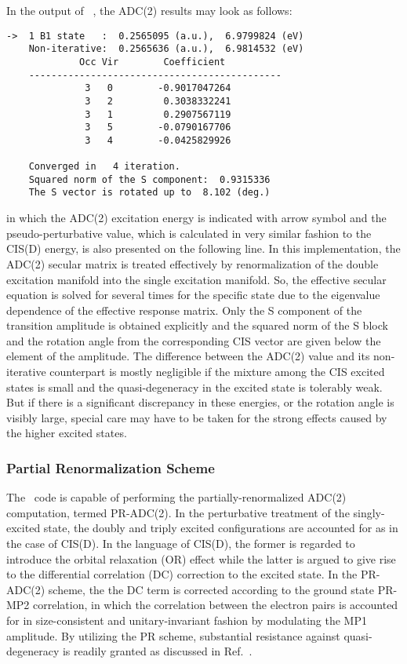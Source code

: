 In the output of \PSIadc\ , the ADC(2) results may look as follows:
\begin{verbatim}
->  1 B1 state   :  0.2565095 (a.u.),  6.9799824 (eV)
    Non-iterative:  0.2565636 (a.u.),  6.9814532 (eV)
             Occ Vir        Coefficient
    ---------------------------------------------
              3   0        -0.9017047264
              3   2         0.3038332241
              3   1         0.2907567119
              3   5        -0.0790167706
              3   4        -0.0425829926
              
    Converged in   4 iteration.
    Squared norm of the S component:  0.9315336
    The S vector is rotated up to  8.102 (deg.)
\end{verbatim} 
in which the ADC(2) excitation energy is indicated with arrow symbol
and the pseudo-perturbative value, which is calculated in very similar
fashion to the CIS(D) energy, is also presented on the following line. In
this implementation, the ADC(2) secular matrix is treated effectively
by renormalization of the double excitation manifold into the single
excitation manifold. So, the effective secular equation is solved for
several times for the specific state due to the eigenvalue dependence of
the effective response matrix. Only the S component of the transition
amplitude is obtained explicitly and the squared norm of the S block
and the rotation angle from the corresponding CIS vector are given
below the element of the amplitude. The difference between the ADC(2)
value and its non-iterative counterpart is mostly negligible if the
mixture among the CIS excited states is small and the quasi-degeneracy
in the excited state is tolerably weak. But if there is a significant
discrepancy in these energies, or the rotation angle is visibly large,
special care may have to be taken for the strong effects caused by the
higher excited states.

\subsubsection{Partial Renormalization Scheme}
The \PSIadc\ code is capable of performing the partially-renormalized
ADC(2) computation, termed PR-ADC(2). In the perturbative treatment of
the singly-excited state, the doubly and triply excited configurations
are accounted for as in the case of CIS(D). In the language of 
CIS(D), the former is regarded to introduce the orbital relaxation (OR)
effect while the latter is argued to give rise to the differential
correlation (DC) correction to the excited state. In the PR-ADC(2)
scheme, the the DC term is corrected according to the ground state
PR-MP2 correlation, in which the correlation between the electron pairs
is accounted for in size-consistent and unitary-invariant fashion by
modulating the MP1 amplitude. By utilizing the PR scheme, substantial
resistance against quasi-degeneracy is readily granted as discussed
in Ref.~\cite{Saitow:2012}.


